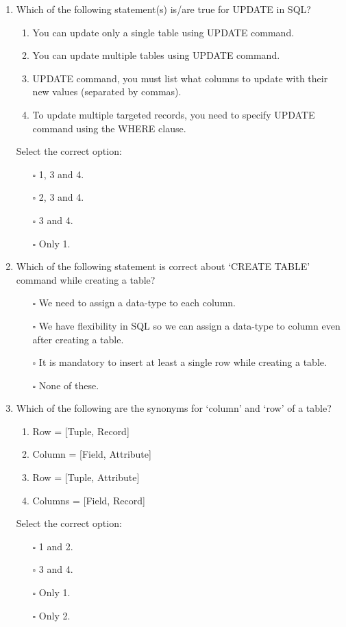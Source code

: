 \documentclass[10pt]{article}
\begin{document}
\begin{enumerate}
			\item Which of the following statement(s) is/are true for UPDATE in SQL?
				\begin{enumerate}
					\item You can update only a single table using UPDATE command.
					\item You can update multiple tables using UPDATE command.
					\item UPDATE command, you must list what columns to update with their new values (separated by commas).
					\item To update multiple targeted records, you need to specify UPDATE command using the WHERE clause.
				\end{enumerate}
				Select the correct option:
				\begin{enumerate}
					\item[$\square$] 1, 3 and 4.
					\item[$\square$] 2, 3 and 4.
					\item[$\square$] 3 and 4.
					\item[$\square$] Only 1.
				\end{enumerate}
			
			\item Which of the following statement is correct about ‘CREATE TABLE’ command while creating a table?
				\begin{enumerate}
					\item[$\square$] We need to assign a data-type to each column.
					\item[$\square$] We have flexibility in SQL so we can assign a data-type to column even after creating a table.
					\item[$\square$] It is mandatory to insert at least a single row while creating a table.
					\item[$\square$] None of these.
				\end{enumerate}

			\item Which of the following are the synonyms for ‘column’ and ‘row’ of a table?
				\begin{enumerate}
					\item Row = [Tuple, Record]
					\item Column = [Field, Attribute]
					\item Row = [Tuple, Attribute]
					\item Columns = [Field, Record]
				\end{enumerate}
				Select the correct option:
				\begin{enumerate}
					\item[$\square$] 1 and 2.
					\item[$\square$] 3 and 4.
					\item[$\square$] Only 1.
					\item[$\square$] Only 2.
				\end{enumerate}


\end{enumerate}
\end{document}
